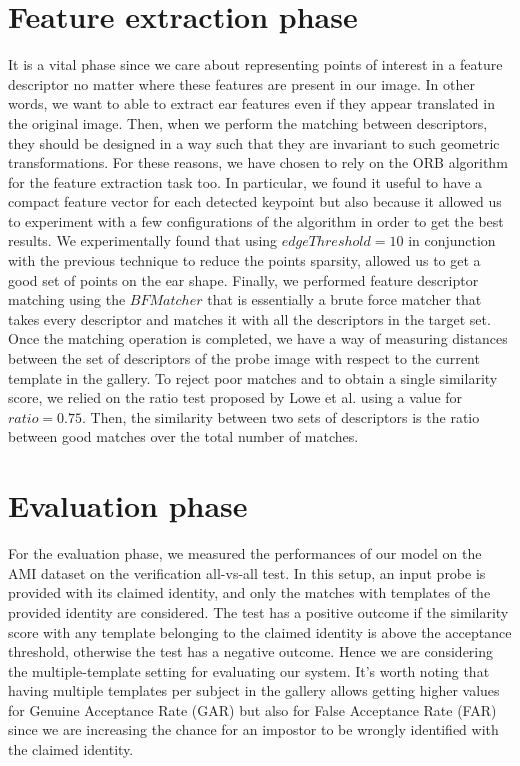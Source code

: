 \documentclass{article}
\begin{document}
\section{Feature extraction phase}

It is a vital phase since we care about representing points of interest in a feature descriptor no matter
where these features are present in our image. In other words, we want to able to extract ear features
even if they appear translated in the original image. Then, when we perform the matching between descriptors,
they should be designed in a way such that they are invariant to such geometric transformations.
For these reasons, we have chosen to rely on the ORB algorithm for the feature extraction task too.
In particular, we found it useful to have a compact feature vector for each detected keypoint but also
because it allowed us to experiment with a few configurations of the algorithm in order to get the best
results. We experimentally found that using $edgeThreshold=10$ in conjunction with the previous technique
to reduce the points sparsity, allowed us to get a good set of points on the ear shape.
Finally, we performed feature descriptor matching using the $BFMatcher$ that is essentially a brute force
matcher that takes every descriptor and matches it with all the descriptors in the target set.
Once the matching operation is completed, we have a way of measuring distances between the set of descriptors
of the probe image with respect to the current template in the gallery. To reject poor matches and to obtain
a single similarity score, we relied on the ratio test proposed by Lowe et al. \cite{Lowe:2004:DIF:993451.996342}
using a value for $ratio=0.75$. Then, the similarity between two sets of descriptors is the ratio between good
matches over the total number of matches.

\section{Evaluation phase}

For the evaluation phase, we measured the performances of our model on the AMI dataset on the verification
all-vs-all test. In this setup, an input probe is provided with its claimed identity, and only the matches
with templates of the provided identity are considered. The test has a positive outcome if the similarity
score with any template belonging to the claimed identity is above the acceptance threshold, otherwise the
test has a negative outcome. Hence we are considering the multiple-template setting for evaluating our system.
It's worth noting that having multiple templates per subject in the gallery allows getting higher values for
Genuine Acceptance Rate (GAR) but also for False Acceptance Rate (FAR) since we are increasing the chance
for an impostor to be wrongly identified with the claimed identity. 
\end{document}
